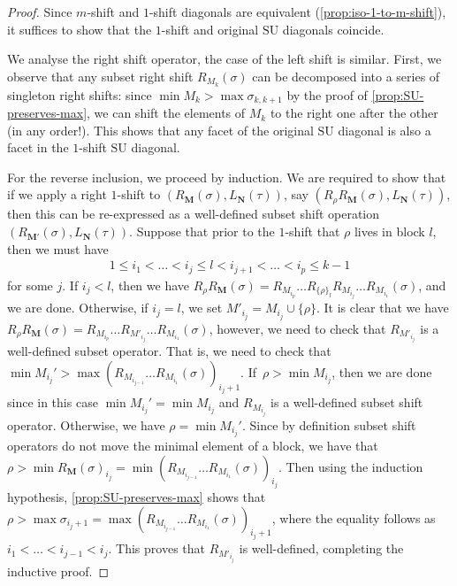 \documentclass{amsart}
\theoremstyle{definition}
\newcommand{\SU}{\mathrm{SU}}
\begin{document}
\begin{proof}
Since $m$-shift and $1$-shift diagonals are equivalent (\cref{prop:iso-1-to-m-shift}), it suffices to show that the $1$-shift and original $\SU$ diagonals coincide. 

We analyse the right shift operator, the case of the left shift is similar. 
First, we observe that any subset right shift $R_{M_k}(\sigma)$ can be decomposed into a series of singleton right shifts: since $\min M_k > \max \sigma_{k,k+1}$ by the proof of \cref{prop:SU-preserves-max}, we can shift the elements of $M_k$ to the right one after the other (in any order!).
This shows that any facet of the original $\SU$ diagonal is also a facet in the $1$-shift $\SU$ diagonal.

For the reverse inclusion, we proceed by induction. 
We are required to show that if we apply a right $1$-shift to $(R_{\mathbf{M}}(\sigma),L_{\mathbf{N}}(\tau))$, say $(R_{\rho}R_{\mathbf{M}}(\sigma),L_{\mathbf{N}}(\tau))$, then this can be re-expressed as a well-defined subset shift operation $(R_{\mathbf{M'}}(\sigma),L_{\mathbf{N}}(\tau))$. Suppose that prior to the $1$-shift that $\rho$ lives in block $l$, then we must have
\begin{align*}
    1 \leq i_1 < \dots < i_j \leq l < i_{j+1} <\dots< i_p \leq k-1
\end{align*}
for some $j$. 
If $i_j < l$, then we have $R_{\rho}R_{\mathbf{M}}(\sigma) = R_{M_{i_p}}\dots R_{\{\rho\}_{l}}R_{M_{i_j}}\dots R_{M_{i_1}}(\sigma)$, and we are done.
Otherwise, if $i_j = l$, we set $M'_{i_j} = M_{i_j} \cup \{\rho \}$. 
It is clear that we have $R_{\rho}R_{\mathbf{M}}(\sigma) = R_{M_{i_p}}\dots R_{M'_{i_j}}\dots R_{M_{i_1}}(\sigma)$, however, we need to check that $R_{M'_{i_j}}$ is a well-defined subset operator. 
That is, we need to check that $\min M_{i_j}' > \max (R_{M_{i_{j-1}}}\dots R_{M_{i_1}}(\sigma))_{i_j+1}$.
If~$\rho > \min M_{i_j}$, then we are done since in this case $\min M_{i_j}'=\min M_{i_j}$ and $R_{M_{i_j}}$ is a well-defined subset shift operator.
Otherwise, we have $\rho=\min M_{i_j}'$. 
Since by definition subset shift operators do not move the minimal element of a block, we have that $\rho > \min R_{\mathbf{M}}(\sigma)_{i_j}= \min (R_{M_{i_{j-1}}}\dots R_{M_{i_1}}(\sigma))_{i_j}$.
Then using the induction hypothesis, \cref{prop:SU-preserves-max} shows that $\rho>\max \sigma_{i_j+1} = \max (R_{M_{i_{j-1}}}\dots R_{M_{i_1}}(\sigma))_{i_j + 1}$, where the equality follows as $i_1<\dots<i_{j-1}<i_j$. 
This proves that $R_{M'_{i_j}}$ is well-defined, completing the inductive proof.
\end{proof}
\end{document}
